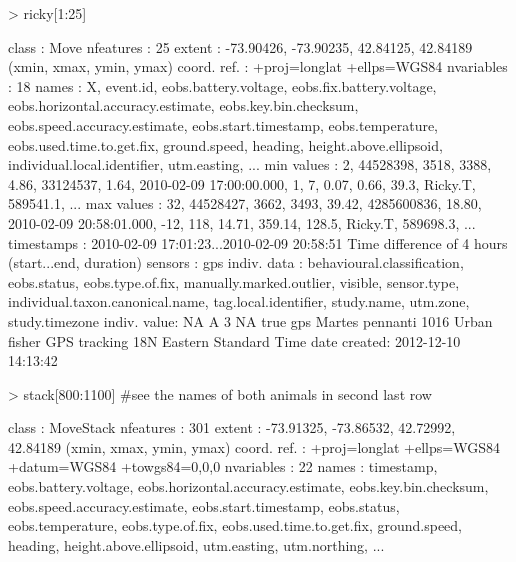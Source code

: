 \documentclass[article,nojss]{jss}
\begin{document}
\begin{Schunk}
\begin{Sinput}
> ricky[1:25]
\end{Sinput}
\begin{Soutput}
class       : Move 
nfeatures   : 25 
extent      : -73.90426, -73.90235, 42.84125, 42.84189  (xmin, xmax, ymin, ymax)
coord. ref. : +proj=longlat +ellps=WGS84 
nvariables  : 18
names       :  X, event.id, eobs.battery.voltage, eobs.fix.battery.voltage, eobs.horizontal.accuracy.estimate, eobs.key.bin.checksum, eobs.speed.accuracy.estimate,    eobs.start.timestamp, eobs.temperature, eobs.used.time.to.get.fix, ground.speed, heading, height.above.ellipsoid, individual.local.identifier, utm.easting, ... 
min values  :  2, 44528398,                 3518,                     3388,                              4.86,              33124537,                         1.64, 2010-02-09 17:00:00.000,                1,                         7,         0.07,    0.66,                   39.3,                     Ricky.T,    589541.1, ... 
max values  : 32, 44528427,                 3662,                     3493,                             39.42,            4285600836,                        18.80, 2010-02-09 20:58:01.000,              -12,                       118,        14.71,  359.14,                  128.5,                     Ricky.T,    589698.3, ... 
timestamps  : 2010-02-09 17:01:23...2010-02-09 20:58:51 Time difference of 4 hours  (start...end, duration) 
sensors     : gps 
indiv. data : behavioural.classification, eobs.status, eobs.type.of.fix, manually.marked.outlier, visible, sensor.type, individual.taxon.canonical.name, tag.local.identifier, study.name, utm.zone, study.timezone 
indiv. value: NA A 3 NA true gps Martes pennanti 1016 Urban fisher GPS tracking 18N Eastern Standard Time 
date created: 2012-12-10 14:13:42 
\end{Soutput}
\begin{Sinput}
> stack[800:1100] #see the names of both animals in second last row
\end{Sinput}
\begin{Soutput}
class       : MoveStack 
nfeatures   : 301 
extent      : -73.91325, -73.86532, 42.72992, 42.84189  (xmin, xmax, ymin, ymax)
coord. ref. : +proj=longlat +ellps=WGS84 +datum=WGS84 +towgs84=0,0,0 
nvariables  : 22
names       :           timestamp, eobs.battery.voltage, eobs.horizontal.accuracy.estimate, eobs.key.bin.checksum, eobs.speed.accuracy.estimate,    eobs.start.timestamp, eobs.status, eobs.temperature, eobs.type.of.fix, eobs.used.time.to.get.fix, ground.speed, heading, height.above.ellipsoid, utm.easting, utm.northing, ... 

\end{Soutput}
\end{Schunk}
\end{document}
